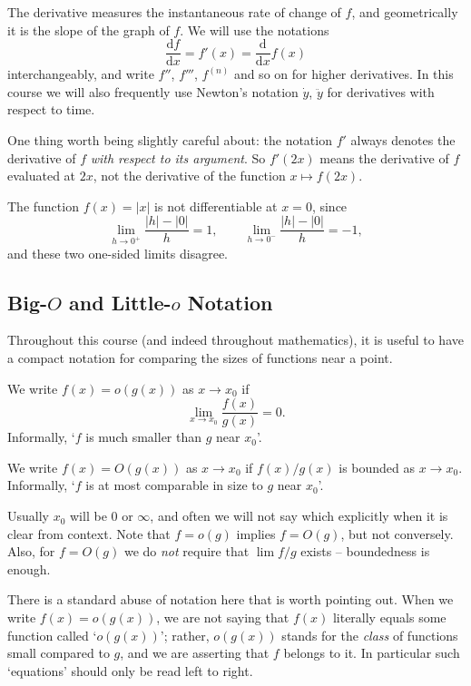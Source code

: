 The derivative measures the instantaneous rate of change of $f$, and geometrically it is the slope of the graph of $f$. We will use the notations
$$
\frac{\mathrm{d}f}{\mathrm{d}x} = f'(x) = \frac{\mathrm{d}}{\mathrm{d}x}f(x)
$$
interchangeably, and write $f''$, $f'''$, $f^{(n)}$ and so on for higher derivatives. In this course we will also frequently use Newton's notation $\dot{y}$, $\ddot{y}$ for derivatives with respect to time.

One thing worth being slightly careful about: the notation $f'$ always denotes the derivative of $f$ \emph{with respect to its argument}. So $f'(2x)$ means the derivative of $f$ evaluated at $2x$, not the derivative of the function $x \mapsto f(2x)$.

\begin{example}
	The function $f(x) = |x|$ is not differentiable at $x = 0$, since
	$$
	\lim_{h \to 0^+} \frac{|h| - |0|}{h} = 1, \qquad \lim_{h \to 0^-} \frac{|h| - |0|}{h} = -1,
	$$
	and these two one-sided limits disagree.
\end{example}

\subsection{Big-$O$ and Little-$o$ Notation}

Throughout this course (and indeed throughout mathematics), it is useful to have a compact notation for comparing the sizes of functions near a point.

\begin{definition}[Little-$o$]
	We write $f(x) = o(g(x))$ as $x \to x_0$ if
	$$
	\lim_{x \to x_0} \frac{f(x)}{g(x)} = 0.
	$$
	Informally, `$f$ is much smaller than $g$ near $x_0$'.
\end{definition}

\begin{definition}[Big-$O$]
	We write $f(x) = O(g(x))$ as $x \to x_0$ if $f(x)/g(x)$ is bounded as $x \to x_0$. Informally, `$f$ is at most comparable in size to $g$ near $x_0$'.
\end{definition}

Usually $x_0$ will be $0$ or $\infty$, and often we will not say which explicitly when it is clear from context. Note that $f = o(g)$ implies $f = O(g)$, but not conversely. Also, for $f = O(g)$ we do \emph{not} require that $\lim f/g$ exists -- boundedness is enough.

There is a standard abuse of notation here that is worth pointing out. When we write $f(x) = o(g(x))$, we are not saying that $f(x)$ literally equals some function called `$o(g(x))$'; rather, $o(g(x))$ stands for the \emph{class} of functions small compared to $g$, and we are asserting that $f$ belongs to it. In particular such `equations' should only be read left to right.


